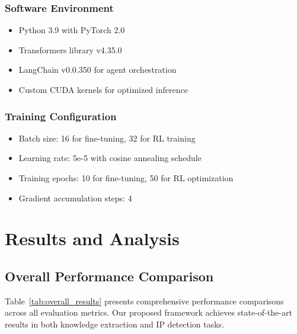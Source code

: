 \documentclass[11pt,a4paper]{article}
\begin{document}
\subsubsection{Software Environment}
\begin{itemize}
  \item Python 3.9 with PyTorch 2.0
  \item Transformers library v4.35.0
  \item LangChain v0.0.350 for agent orchestration
  \item Custom CUDA kernels for optimized inference
\end{itemize}

\subsubsection{Training Configuration}
\begin{itemize}
  \item Batch size: 16 for fine-tuning, 32 for RL training
  \item Learning rate: 5e-5 with cosine annealing schedule
  \item Training epochs: 10 for fine-tuning, 50 for RL optimization
  \item Gradient accumulation steps: 4
\end{itemize}

\section{Results and Analysis}

\subsection{Overall Performance Comparison}

Table~\ref{tab:overall_results} presents comprehensive performance comparisons across all evaluation metrics. Our proposed framework achieves state-of-the-art results in both knowledge extraction and IP detection tasks.
\end{document}
